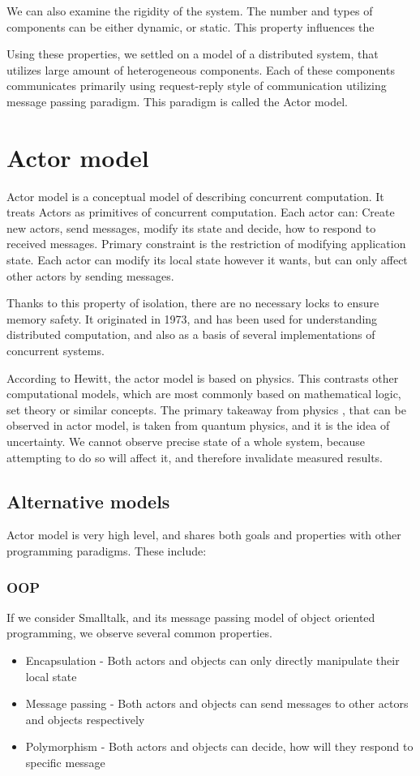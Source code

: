We can also examine the rigidity of the system. The number and types of components can be either dynamic, or static. This
property influences the 

Using these properties, we settled on a model of a distributed system, that utilizes large amount of heterogeneous components.
Each of these components communicates primarily using request-reply style of communication utilizing message passing paradigm.
This paradigm is called the Actor model.

\section{Actor model}
Actor model is a conceptual model of describing concurrent computation. It treats Actors as primitives of concurrent
computation. Each actor can: Create new actors, send messages, modify its state and decide, how to respond to
received messages. Primary constraint is the restriction of modifying application state.
Each actor can modify its local state however it wants, but can only affect other actors by sending messages.

Thanks to this property of isolation, there are no necessary locks to ensure memory safety.
It originated in 1973, and has been used for understanding distributed computation, and also as
a basis of several implementations of concurrent systems.

According to Hewitt\cite{journal:actor}, the actor model is based on physics. This contrasts
other computational models, which are most commonly based on mathematical logic, set theory or similar concepts.
The primary takeaway from physics , that can be observed in actor model, is taken from quantum physics, and it
is the idea of uncertainty. We cannot observe precise state of a whole system, because attempting to do so
will affect it, and therefore invalidate measured results.

\subsection{Alternative models}
Actor model is very high level, and shares both goals and properties with other programming paradigms. These
include:
\subsubsection{OOP}
If we consider Smalltalk, and its message passing model of object oriented programming, we observe several common properties.
\begin{itemize}
    \item Encapsulation - Both actors and objects can only directly manipulate their local state
    \item Message passing - Both actors and objects can send messages to other actors and objects respectively
    \item Polymorphism - Both actors and objects can decide, how will they respond to specific message
\end{itemize}


